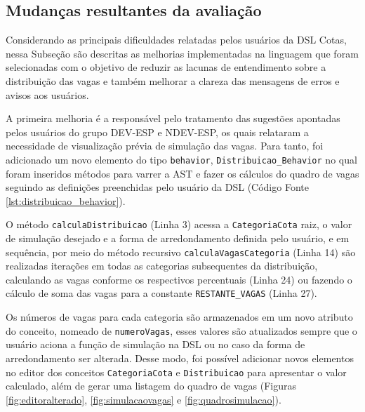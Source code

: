 \subsection{Mudanças resultantes da avaliação}
\label{sec:mudanasresultantes}

Considerando as principais dificuldades relatadas pelos usuários da DSL Cotas, nessa Subseção são descritas as melhorias implementadas na linguagem que foram selecionadas com o objetivo de reduzir as lacunas de entendimento sobre a distribuição das vagas e também melhorar a clareza das mensagens de erros e avisos aos usuários.

A primeira melhoria é a responsável pelo tratamento das sugestões apontadas pelos usuários do grupo DEV-ESP e NDEV-ESP, os quais relataram a necessidade de visualização prévia de simulação das vagas. Para tanto, foi adicionado um novo elemento do tipo \texttt{behavior}, \texttt{Distribuicao\_Behavior} no qual foram inseridos métodos para varrer a \gls{AST} e fazer os cálculos do quadro de vagas seguindo as definições preenchidas pelo usuário da DSL (Código Fonte \ref{lst:distribuicao_behavior}).

\newpage




O método \texttt{calculaDistribuicao} (Linha 3) acessa a \texttt{CategoriaCota} raiz, o valor de simulação desejado e a forma de arredondamento definida pelo usuário, e em sequência, por meio do método recursivo \texttt{calculaVagasCategoria} (Linha 14) são realizadas iterações em todas as categorias subsequentes da distribuição, calculando as vagas conforme os respectivos percentuais (Linha 24) ou fazendo o cálculo de soma das vagas para a constante \texttt{RESTANTE\_VAGAS} (Linha 27). 

Os números de vagas para cada categoria são armazenados em um novo atributo do conceito, nomeado de \texttt{numeroVagas}, esses valores são atualizados sempre que o usuário aciona a função de simulação na DSL ou no caso da forma de arredondamento ser alterada. Desse modo, foi possível adicionar novos elementos no editor dos conceitos \texttt{CategoriaCota} e \texttt{Distribuicao} para apresentar o valor calculado, além de gerar uma listagem do quadro de vagas (Figuras \ref{fig:editoralterado}, \ref{fig:simulacaovagas} e \ref{fig:quadrosimulacao}).




